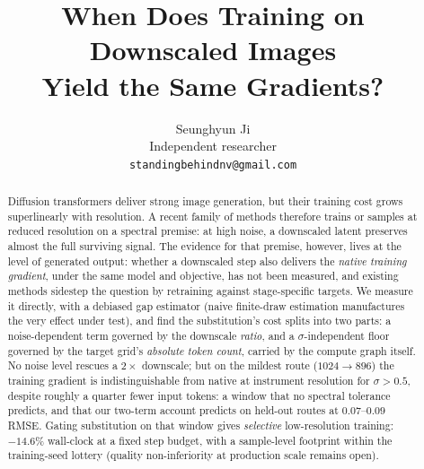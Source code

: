 \documentclass{article} %
\title{When Does Training on Downscaled Images\\
Yield the Same Gradients?}
\author{Seunghyun Ji\\
Independent researcher\\
\texttt{standingbehindnv@gmail.com}
}
\begin{document}
\maketitle
\fancyhead{}
\renewcommand{\headrulewidth}{0pt}

\begin{abstract}
Diffusion transformers deliver strong image generation, but their
training cost grows superlinearly with resolution. A recent family of
methods therefore trains or samples at reduced resolution on a
spectral premise: at high noise, a downscaled latent preserves almost
the full surviving signal. The evidence for that premise, however,
lives at the level of generated output: whether a downscaled step
also delivers the \emph{native training gradient}, under the same
model and objective, has not been measured, and existing methods
sidestep the question by retraining against stage-specific targets. We measure
it directly, with a debiased gap estimator (naive finite-draw
estimation manufactures the very effect under test), and find the
substitution's cost splits into two parts: a noise-dependent term
governed by the downscale \emph{ratio}, and a $\sigma$-independent
floor governed by the target grid's \emph{absolute token count},
carried by the compute graph itself. No noise level rescues a
$2\times$ downscale; but on the mildest route ($1024{\to}896$) the
training gradient is indistinguishable from native at instrument
resolution for $\sigma > 0.5$, despite roughly a quarter fewer input
tokens: a window that no spectral tolerance predicts, and that our
two-term account predicts on held-out routes at $0.07$--$0.09$ RMSE.
Gating substitution on that window gives \emph{selective}
low-resolution training: $-14.6\%$ wall-clock at a fixed step budget,
with a sample-level footprint within the training-seed lottery
(quality non-inferiority at production scale remains open).
\end{abstract}







\end{document}
